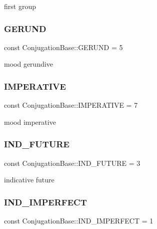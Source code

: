 first group \hypertarget{class_conjugation_base_ace9d609af36ad729f01d6534c81caf4c}{}\label{class_conjugation_base_ace9d609af36ad729f01d6534c81caf4c} 
\subsubsection{\texorpdfstring{G\+E\+R\+U\+ND}{GERUND}}
{\footnotesize\ttfamily const Conjugation\+Base\+::\+G\+E\+R\+U\+ND = 5}

mood gerundive \hypertarget{class_conjugation_base_ae4ec99d52ae2e6edd912cf67e78442bb}{}\label{class_conjugation_base_ae4ec99d52ae2e6edd912cf67e78442bb} 
\subsubsection{\texorpdfstring{I\+M\+P\+E\+R\+A\+T\+I\+VE}{IMPERATIVE}}
{\footnotesize\ttfamily const Conjugation\+Base\+::\+I\+M\+P\+E\+R\+A\+T\+I\+VE = 7}

mood imperative \hypertarget{class_conjugation_base_ac25ac0244050e86a405bbf6fa9043a3e}{}\label{class_conjugation_base_ac25ac0244050e86a405bbf6fa9043a3e} 
\subsubsection{\texorpdfstring{I\+N\+D\+\_\+\+F\+U\+T\+U\+RE}{IND\_FUTURE}}
{\footnotesize\ttfamily const Conjugation\+Base\+::\+I\+N\+D\+\_\+\+F\+U\+T\+U\+RE = 3}

indicative future \hypertarget{class_conjugation_base_aff9c382a23aa5533dfed3be1f01a6b2f}{}\label{class_conjugation_base_aff9c382a23aa5533dfed3be1f01a6b2f} 
\subsubsection{\texorpdfstring{I\+N\+D\+\_\+\+I\+M\+P\+E\+R\+F\+E\+CT}{IND\_IMPERFECT}}
{\footnotesize\ttfamily const Conjugation\+Base\+::\+I\+N\+D\+\_\+\+I\+M\+P\+E\+R\+F\+E\+CT = 1}

